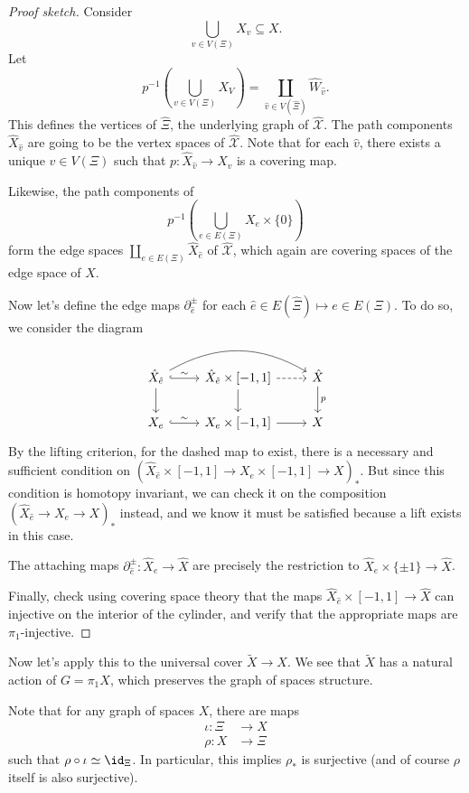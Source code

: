 \documentclass[a4paper]{article}
\begin{document}
\begin{proof}[Proof sketch]
  Consider
  \[
    \bigcup_{v \in V(\Xi)} X_v \subseteq X.
  \]
  Let
  \[
    p^{-1}\left(\bigcup_{v \in V(\Xi)} X_V\right) = \coprod_{\hat{v} \in V(\hat{\Xi})} \hat{W}_{\hat{v}}.
  \]
  This defines the vertices of $\hat{\Xi}$, the underlying graph of $\hat{\mathcal{X}}$. The path components $\hat{X}_{\hat{v}}$ are going to be the vertex spaces of $\hat{\mathcal{X}}$. Note that for each $\hat{v}$, there exists a unique $v \in V(\Xi)$ such that $p: \hat{X}_{\hat{v}} \to X_v$ is a covering map.

  Likewise, the path components of
  \[
    p^{-1}\left(\bigcup_{e \in E(\Xi)} X_e \times \{0\}\right)
  \]
  form the edge spaces $\coprod_{e \in E(\Xi)} \hat{X}_{\hat{e}}$ of $\hat{\mathcal{X}}$, which again are covering spaces of the edge space of $X$.

  Now let's define the edge maps $\partial_{\hat{e}}^{\pm}$ for each $\hat{e} \in E(\hat{\Xi}) \mapsto e \in E(\Xi)$. To do so, we consider the diagram
  \[
    \begin{tikzcd}
      \hat{X}_{\hat{e}} \ar[r, hook, "\sim"] \ar[rr, bend left] \ar[d] & \hat{X}_{\hat{e}} \times [-1, 1] \ar[d] \ar[r, dashed] & \hat{X} \ar[d, "p"]\\
      X_e \ar[r, hook, "\sim"] & X_e \times [-1, 1] \ar[r] & X
    \end{tikzcd}
  \]
  By the lifting criterion, for the dashed map to exist, there is a necessary and sufficient condition on $(\hat{X}_{\hat{e}} \times [-1, 1] \to X_e \times [-1, 1] \to X)_*$. But since this condition is homotopy invariant, we can check it on the composition $(\hat{X}_{\hat{e}} \to X_e \to X)_*$ instead, and we know it must be satisfied because a lift exists in this case.

  The attaching maps $\partial^{\pm}_{\hat{e}}: \hat{X}_e \to \hat{X}$ are precisely the restriction to $\hat{X}_e \times \{\pm 1\} \to \hat{X}$.

  Finally, check using covering space theory that the maps $\hat{X}_{\hat{e}} \times [-1, 1] \to \hat{X}$ can injective on the interior of the cylinder, and verify that the appropriate maps are $\pi_1$-injective.
\end{proof}

Now let's apply this to the universal cover $\tilde{X} \to X$. We see that $\tilde{X}$ has a natural action of $G = \pi_1X$, which preserves the graph of spaces structure.

Note that for any graph of spaces $X$, there are maps
\begin{align*}
  \iota: \Xi &\to X\\
  \rho: X &\to \Xi
\end{align*}
such that $\rho \circ \iota \simeq \id_{\Xi}$. In particular, this implies $\rho_*$ is surjective (and of course $\rho$ itself is also surjective).
\end{document}

